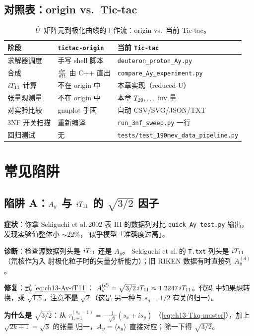 \subsection{对照表：origin vs.\ Tic-tac}
\label{subsec:ch13-origin-comparison}

\begin{table}[h]
\centering
\caption{\(\hat{U}\)-矩阵元到极化曲线的工作流：origin vs.\ 当前 Tic-tac。}
\label{tab:ch13-origin-vs-current}
\begin{tabular}{lll}
\toprule
阶段 & \texttt{tictac-origin} & 当前 \texttt{Tic-tac} \\
\midrule
求解器调度 & 手写 shell 脚本 & \texttt{deuteron\_proton\_Ay.py} \\
合成 & \(\frac{d\sigma}{d\Omega}\) 由 C++ 直出 & \texttt{compare\_Ay\_experiment.py} \\
\({i T_{11}}\) 计算 & 不在 origin 中 & 本章实现（reduced-U） \\
张量观测量 & 不在 origin 中 & 本章 \({T_{20}}, \ldots\) inv 量 \\
对实验比较 & gnuplot 手画 & 自动 CSV/SVG/JSON/TXT \\
3NF 开关扫描 & 重新编译 & \texttt{run\_3nf\_sweep.py} 一行 \\
回归测试 & 无 & \texttt{tests/test\_190mev\_data\_pipeline.py} \\
\bottomrule
\end{tabular}
\end{table}

\section{常见陷阱}
\label{sec:ch13-pitfalls}

\subsection{陷阱 A：\(A_y\) 与 \({i T_{11}}\) 的 \(\sqrt{3/2}\) 因子}
\label{subsec:ch13-pitfall-Ay-vs-iT11}

\begin{pitfallbox}
\textbf{症状}：你拿 Sekiguchi et al.\,2002 表 III 的数据列对比
\texttt{quick\_Ay\_test.py} 输出，发现实验值整体小 \(\sim 22\%\)，
似乎模型「准确度过高」。

\textbf{诊断}：检查源数据列头是 \({i T_{11}}\) 还是 \(A_y\)。
Sekiguchi et al.\,的 \texttt{T.txt} 列头是 \({i T_{11}}\)（氘核作为入
射极化粒子时的矢量分析能力）；旧 RIKEN 数据有时直接列 \(A_y^{(d)}\)。

\textbf{修复}：式 \eqref{eq:ch13-Ay-iT11}：
\(A_y^{(d)} = \sqrt{3/2}\,{i T_{11}} \approx 1.2247\,{i T_{11}}\)。代码
中如果想转换，乘 \(\sqrt{1.5}\)。注意\textbf{不是} \(\sqrt{2}\)（这是
另一种与 \(s_a = 1/2\) 有关的归一）。

\textbf{为什么是 \(\sqrt{3/2}\)}：从
\(\tau_{1,+1}^{(s_a=1)} = -\frac{1}{\sqrt{2}}(s_x + i s_y)\)
（\cref{eq:ch13-Tkq-master}），加上 \(\sqrt{2k+1} = \sqrt{3}\) 的张量
归一，\(A_y = \langle s_y\rangle\) 直接对应；除一下得
\(\sqrt{3/2}\)。
\end{pitfallbox}

